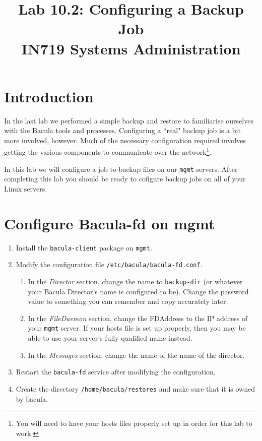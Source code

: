 \documentclass{article}   	%
\title{Lab 10.2:  Configuring a Backup Job\\ IN719 Systems Administration}
\date{}							%
\begin{document}
\maketitle

\section*{Introduction}
In the last lab we performed a simple backup and restore to familiarise ourselves with the Bacula tools and processes.  Configuring a ``real" backup job is a bit more involved, however.  Much of the necessary configuration required involves getting the various components to communicate over the network\footnote{You will need to have your hosts files properly set up in order for this lab to work.}.

In this lab we will configure a job to backup files on our \texttt{mgmt} servers.  After completing this lab you should be ready to cofigure backup jobs on all of your Linux servers.

\section{Configure Bacula-fd on mgmt}
\begin{enumerate}
  \item Install the \texttt{bacula-client} package on \texttt{mgmt}.
  \item Modify the configuration file \texttt{/etc/bacula/bacula-fd.conf}.
  \begin{enumerate}
    \item In the \emph{Director} section, change the name to \texttt{backup-dir} (or whatever your 
          Bacula Director's name is configured to be).  Change the password value to something you can
	  remember and copy accurately later.
    \item In the \emph{FileDaemon} section, change the FDAddress to the IP address of your \texttt{mgmt}
          server.  If your hosts file is set up properly, then you may be able to use your server's
	  fully qualified name instead.
    \item In the \emph{Messages} section, change the name of the name of the director.
  \end{enumerate}
  \item Restart the \texttt{bacula-fd} service after modifying the configuration.
  \item Create the directory \texttt{/home/bacula/restores} and make sure that it is owned by bacula.
\end{enumerate}
\end{document}
